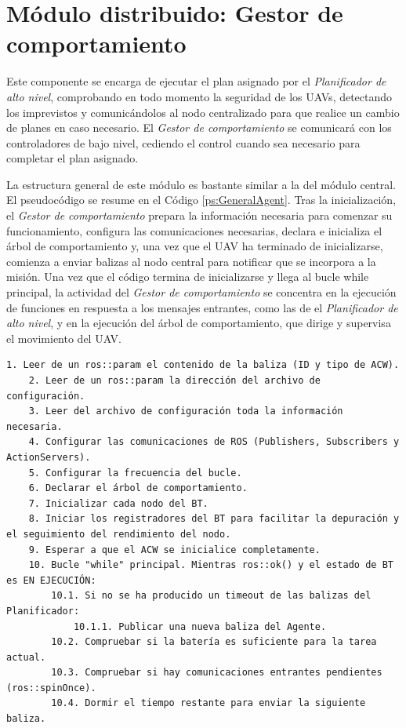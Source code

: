 \documentclass[fontsize=11pt, English=false, Español=true, Myfinal=true, twoside, numbers=noenddot]{scrbook}
\begin{document}
\section{Módulo distribuido: Gestor de comportamiento}
\label{sec:Distributed module: behaviour manager}
Este componente se encarga de ejecutar el plan asignado por el \emph{Planificador de alto nivel}, comprobando en todo momento la seguridad de los \glspl{UAV}, detectando los imprevistos y comunicándolos al nodo centralizado para que realice un cambio de planes en caso necesario. El \emph{Gestor de comportamiento} se comunicará con los controladores de bajo nivel, cediendo el control cuando sea necesario para completar el plan asignado.

La estructura general de este módulo es bastante similar a la del módulo central. El pseudocódigo se resume en el Código \ref{ps:GeneralAgent}. Tras la inicialización, el \emph{Gestor de comportamiento} prepara la información necesaria para comenzar su funcionamiento, configura las comunicaciones necesarias, declara e inicializa el árbol de comportamiento y, una vez que el \gls{UAV} ha terminado de inicializarse, comienza a enviar balizas al nodo central para notificar que se incorpora a la misión. Una vez que el código termina de inicializarse y llega al bucle while principal, la actividad del \emph{Gestor de comportamiento} se concentra en la ejecución de funciones en respuesta a los mensajes entrantes, como las de el \emph{Planificador de alto nivel}, y en la ejecución del árbol de comportamiento, que dirige y supervisa el movimiento del \gls{UAV}.

\begin{lstlisting}[caption={Pseudocódigo del bloque \emph{Gestor de comportamiento}}, breaklines=true, label=ps:GeneralAgent]
	1. Leer de un ros::param el contenido de la baliza (ID y tipo de ACW).
	2. Leer de un ros::param la dirección del archivo de configuración.
	3. Leer del archivo de configuración toda la información necesaria.
	4. Configurar las comunicaciones de ROS (Publishers, Subscribers y ActionServers).
	5. Configurar la frecuencia del bucle.
	6. Declarar el árbol de comportamiento.
	7. Inicializar cada nodo del BT.
	8. Iniciar los registradores del BT para facilitar la depuración y el seguimiento del rendimiento del nodo.
	9. Esperar a que el ACW se inicialice completamente.
	10. Bucle "while" principal. Mientras ros::ok() y el estado de BT es EN EJECUCIÓN:
		10.1. Si no se ha producido un timeout de las balizas del Planificador:
			10.1.1. Publicar una nueva baliza del Agente.
		10.2. Compruebar si la batería es suficiente para la tarea actual.
		10.3. Compruebar si hay comunicaciones entrantes pendientes (ros::spinOnce).
		10.4. Dormir el tiempo restante para enviar la siguiente baliza.
\end{lstlisting}
\end{document}
